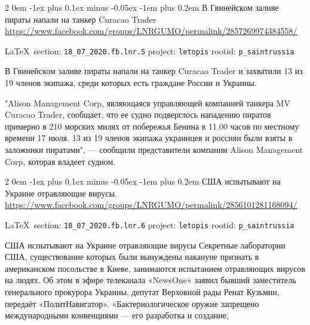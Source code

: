 \documentclass[a4paper,11pt]{extreport}
\makeatletter
\renewcommand\subsection{%
  \clearpage
    \@startsection{subsection}%
    {2}%
    {0em}%
    {-1ex plus 0.1ex minus -0.05ex}%
    {-1em plus 0.2em}%
    {\scshape\bfseries\Large}%
}
\makeatother
\begin{document}
 
\subsection{В Гвинейском заливе пираты напали на танкер Curacao Trader}
\label{sec:18_07_2020.fb.lnr.5}
\url{https://www.facebook.com/groups/LNRGUMO/permalink/2857269974384558/}
  
\vspace{0.5cm}
{\small\LaTeX~section: \verb|18_07_2020.fb.lnr.5| project: \verb|letopis| rootid: \verb|p_saintrussia|}
\vspace{0.5cm}
  
В Гвинейском заливе пираты напали на танкер Curacao Trader и захватили 13 из 19
членов экипажа, среди которых есть граждане России и Украины.

"Alison Management Corp, являющаяся управляющей компанией танкера MV Curacao
Trader, сообщает, что ее судно подверглось нападению пиратов примерно в 210
морских милях от побережья Бенина в 11.00 часов по местному времени 17 июля. 13
из 19 членов экипажа украинцев и россиян были взяты в заложники пиратами", —
сообщили представители компании Alison Management Corp, которая владеет судном.
 
 
  
\subsection{США испытывают на Украине отравляющие вирусы.}
\label{sec:18_07_2020.fb.lnr.6}
\url{https://www.facebook.com/groups/LNRGUMO/permalink/2856101281168094/}

\vspace{0.5cm}
{\small\LaTeX~section: \verb|18_07_2020.fb.lnr.6| project: \verb|letopis| rootid: \verb|p_saintrussia|}
\vspace{0.5cm}

США испытывают на Украине отравляющие вирусы Секретные лаборатории США,
существование которых были вынуждены накануне признать в американском
посольстве в Киеве, занимаются испытанием отравляющих вирусов на людях. Об этом
в эфире телеканала «NewsOne» заявил бывший заместитель генерального прокурора
Украины, депутат Верховной рады Ренат Кузьмин, передаёт «ПолитНавигатор».
«Бактериологическое оружие запрещено международными конвенциями --- его
разработка и создание, 
 
\end{document}
